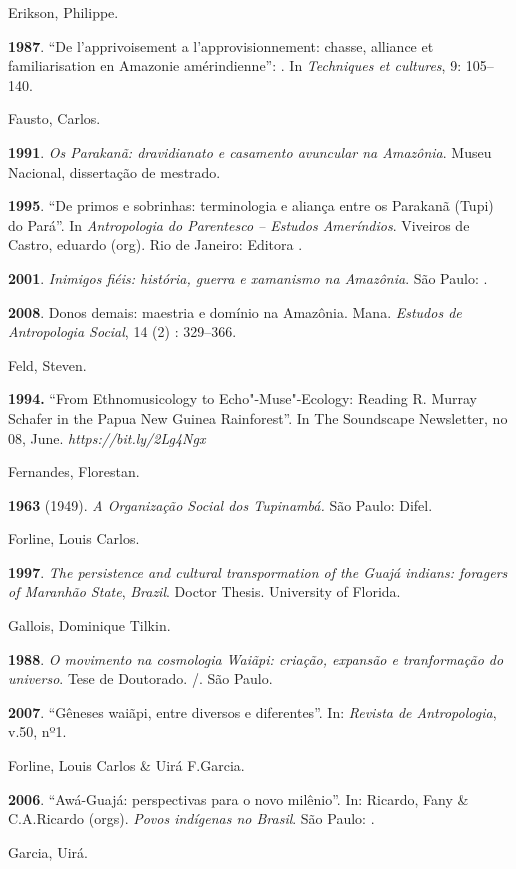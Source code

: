 \begin{Parskip}
Erikson, Philippe.

\textbf{1987}. ``De l'apprivoisement a l'approvisionnement: chasse,
alliance et familiarisation en Amazonie amérindienne'': . In
\emph{Techniques et cultures}, 9: 105--140.

Fausto, Carlos.

\textbf{1991}. \emph{Os Parakanã: dravidianato e casamento avuncular na
Amazônia}. Museu Nacional, dissertação de mestrado.

\textbf{1995}. ``De primos e sobrinhas: terminologia e aliança entre os
Parakanã (Tupi) do Pará''. In \emph{Antropologia do Parentesco -- Estudos
Ameríndios}. Viveiros de Castro, eduardo (org). Rio de Janeiro: Editora
.

\textbf{2001}. \emph{Inimigos fiéis: história, guerra e xamanismo na
Amazônia}. São Paulo: .

\textbf{2008}. Donos demais: maestria e domínio na Amazônia. Mana.
\emph{Estudos de Antropologia Social}, 14 (2) : 329--366.

Feld, Steven.

\textbf{1994.} ``From Ethnomusicology to Echo"-Muse"-Ecology: Reading R.
Murray Schafer in the Papua New Guinea Rainforest''. In The Soundscape
Newsletter, no 08, June.
\emph{https://bit.ly/2Lg4Ngx}

Fernandes, Florestan.

\textbf{1963} (1949). \emph{A Organização Social dos Tupinambá.} São
Paulo: Difel.

Forline, Louis Carlos.

\textbf{1997}. \emph{The persistence and cultural transpormation of the
Guajá indians: foragers of Maranhão State}, \emph{Brazil}. Doctor
Thesis. University of Florida.

Gallois, Dominique Tilkin.

\textbf{1988}. \emph{O movimento na cosmologia Waiãpi: criação, expansão
e tranformação do universo}. Tese de Doutorado. /. São Paulo.

\textbf{2007}. ``Gêneses waiãpi, entre diversos e diferentes''. In:
\emph{Revista de Antropologia}, v.50, nº1.

Forline, Louis Carlos \& Uirá F.Garcia.

\textbf{2006}. ``Awá-Guajá: perspectivas para o novo milênio''. In:
Ricardo, Fany \& C.A.Ricardo (orgs). \emph{Povos indígenas no Brasil}.
São Paulo: .

Garcia, Uirá.


\end{Parskip}

